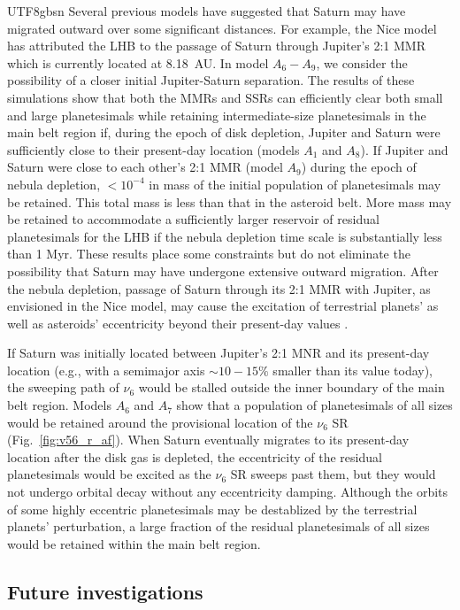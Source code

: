 \documentclass[tighten]{aastex6}
\begin{document}
\begin{CJK*}{UTF8}{gbsn}
Several previous models have suggested that Saturn may have migrated
outward over some significant distances.  For example, the Nice model
has attributed the LHB to the passage of Saturn
through Jupiter's 2:1 MMR which is currently located 
at 8.18~AU.  In model $A_{6}-A_{9}$, we consider the possibility of a 
closer initial Jupiter-Saturn separation.
The results of these simulations show that both the MMRs and SSRs can
efficiently clear both small and large planetesimals while retaining 
intermediate-size planetesimals in the main belt region if, during the
epoch of disk depletion, Jupiter and Saturn were sufficiently 
close to their present-day location (models $A_1$ and $A_8$). If
Jupiter and Saturn were close to each other's 2:1 MMR (model $A_9$)
during the epoch of nebula depletion, $<10^{-4}$ in mass of the 
initial population of planetesimals may be retained.  This total
mass is less than that in the asteroid belt.  More mass may be
retained to accommodate a sufficiently larger reservoir of residual
planetesimals for the LHB if the nebula depletion 
time scale is substantially less than 1 Myr.
These results place some constraints but do not eliminate the 
possibility that Saturn may have undergone extensive outward migration.
After the nebula depletion, passage of Saturn through its 2:1 MMR with Jupiter, as envisioned in the Nice model, may 
cause the excitation of terrestrial planets' as well as asteroids'
eccentricity beyond their present-day values \citep{agnorlin2012}. 

If Saturn was initially located 
between Jupiter's 2:1 MNR and its present-day location (e.g., with a semimajor axis $\sim 10-15\%$ smaller than its value today), the sweeping 
path of $\nu_6$ would be stalled outside the inner boundary of the main 
belt region.  Models $A_6$ and $A_7$ show that a population of 
planetesimals of all sizes would be retained around the provisional 
location of the $\nu_6$ SR (Fig.~\ref{fig:v56_r_af}). When Saturn 
eventually migrates to its present-day location after the disk gas 
is depleted, the eccentricity of the residual planetesimals would be 
excited as the $\nu_6$ SR sweeps past them, but they would not undergo 
orbital decay without any eccentricity damping. Although the 
orbits of some highly eccentric planetesimals may be destablized by 
the terrestrial planets'  perturbation, a large fraction of the 
residual planetesimals of all sizes would be retained within the 
main belt region.


\subsection{Future investigations}


\end{CJK*}
\end{document}
